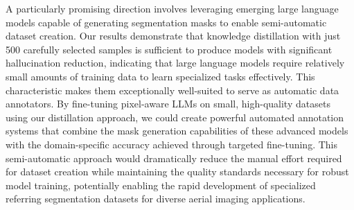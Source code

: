 A particularly promising direction involves leveraging emerging large language models capable of generating segmentation masks to enable semi-automatic dataset creation. Our results demonstrate that knowledge distillation with just 500 carefully selected samples is sufficient to produce models with significant hallucination reduction, indicating that large language models require relatively small amounts of training data to learn specialized tasks effectively. This characteristic makes them exceptionally well-suited to serve as automatic data annotators. By fine-tuning pixel-aware LLMs on small, high-quality datasets using our distillation approach, we could create powerful automated annotation systems that combine the mask generation capabilities of these advanced models with the domain-specific accuracy achieved through targeted fine-tuning. This semi-automatic approach would dramatically reduce the manual effort required for dataset creation while maintaining the quality standards necessary for robust model training, potentially enabling the rapid development of specialized referring segmentation datasets for diverse aerial imaging applications.

